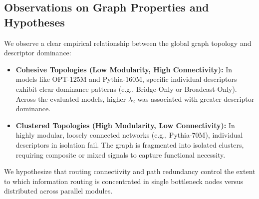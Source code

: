 \documentclass[11pt,a4paper]{article}
\theoremstyle{definition}
\theoremstyle{plain}
\begin{document}
\begin{table}[h]
\centering
\caption{Global topological graph statistics (Total Heads $N$, Algebraic Connectivity $\lambda_2$, Graph Modularity $Q$) and dominant routing descriptors across models. Statistics are calculated from unthresholded directed dependency graphs, showing a clean monotonic relationship: models with higher connectivity ($\lambda_2$) exhibit lower modularity ($Q$), allowing single dominant descriptors (e.g., Broadcast-Only) to explain head importance, while modular graphs (e.g., Pythia-70M) require mixed composite descriptors.}
\label{tab:graph_stats}
\end{table}

\subsection{Observations on Graph Properties and Hypotheses}
We observe a clear empirical relationship between the global graph topology and descriptor dominance:
\begin{itemize}
    \item \textbf{Cohesive Topologies (Low Modularity, High Connectivity):} In models like OPT-125M and Pythia-160M, specific individual descriptors exhibit clear dominance patterns (e.g., Bridge-Only or Broadcast-Only). Across the evaluated models, higher $\lambda_2$ was associated with greater descriptor dominance.
    \item \textbf{Clustered Topologies (High Modularity, Low Connectivity):} In highly modular, loosely connected networks (e.g., Pythia-70M), individual descriptors in isolation fail. The graph is fragmented into isolated clusters, requiring composite or mixed signals to capture functional necessity.
\end{itemize}
We hypothesize that routing connectivity and path redundancy control the extent to which information routing is concentrated in single bottleneck nodes versus distributed across parallel modules.
\end{document}
